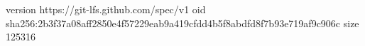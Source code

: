 version https://git-lfs.github.com/spec/v1
oid sha256:2b3f37a08aff2850e4f57229eab9a419cfdd4b5f8abdfd8f7b93e719af9c906c
size 125316
